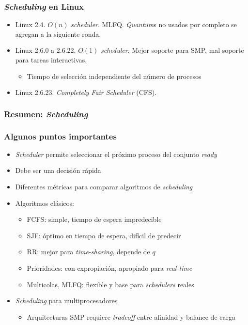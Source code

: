 \documentclass[letter]{beamer}
\begin{document}
\begin{frame}
  \frametitle{{\em Scheduling} en Linux}

  \begin{itemize}
    \item Linux 2.4. $O(n)$ {\em scheduler}. MLFQ. {\em Quantum}s no usados por completo se agregan a la siguiente ronda.
    \item Linux 2.6.0 a 2.6.22. $O(1)$ {\em scheduler}. Mejor soporte para SMP, mal soporte para tareas interactivas.
       \begin{itemize}
         \item Tiempo de selección independiente del número de procesos
       \end{itemize}
    \item Linux 2.6.23. {\em Completely Fair Scheduler} (CFS).
  \end{itemize}

\end{frame}
\begin{frame}
  \frametitle{Resumen: {\em Scheduling}}
  \frametitle{Algunos puntos importantes}
  
  \begin{itemize}
    \item {\em Scheduler} permite seleccionar el próximo proceso del conjunto {\em ready}
    \item Debe ser una decisión rápida
    \item Diferentes métricas para comparar algoritmos de {\em scheduling}
    \item Algoritmos clásicos:
      \begin{itemize}
        \item FCFS: simple, tiempo de espera impredecible
        \item SJF: óptimo en tiempo de espera, difícil de predecir
        \item RR: mejor para {\em time-sharing}, depende de $q$
        \item Prioridades: con expropiación, apropiado para {\em real-time}
        \item Multicolas, MLFQ: flexible y base para {\em schedulers} reales
      \end{itemize}  
    \item {\em Scheduling} para multiprocesadores
      \begin{itemize}
        \item Arquitecturas SMP requiere {\em tradeoff} entre afinidad y balance de carga
      \end{itemize}
  \end{itemize}

\end{frame}
\end{document}
